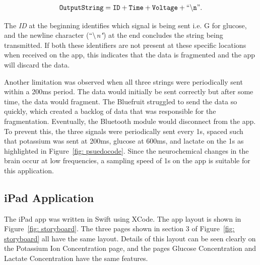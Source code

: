 \begin{align}
    \tt{OutputString = ID + Time + Voltage + ``\backslash n"}.
    \nonumber
\end{align}

The \textit{ID} at the beginning identifies which signal is being sent i.e. G for glucose, and the newline character (\textit{$``\backslash$n"}) at the end concludes the string being transmitted. If both these identifiers are not present at these specific locations when received on the app, this indicates that the data is fragmented and the app will discard the data. 

Another limitation was observed when all three strings were periodically sent within a 200ms period. The data would initially be sent correctly but after some time, the data would fragment. The Bluefruit struggled to send the data so quickly, which created a backlog of data that was responsible for the fragmentation. Eventually, the Bluetooth module would disconnect from the app. To prevent this, the three signals were periodically sent every 1s, spaced such that potassium was sent at 200ms, glucose at 600ms, and lactate on the 1s as highlighted in Figure~\ref{fig: psuedocode}. Since the neurochemical changes in the brain occur at low frequencies, a sampling speed of 1s on the app is suitable for this application. 





\subsection{iPad Application}
The iPad app was written in Swift using XCode. The app layout is shown in Figure~\ref{fig: storyboard}. The three pages shown in section 3 of Figure~\ref{fig: storyboard} all have the same layout. Details of this layout can be seen clearly on the Potassium Ion Concentration page, and the pages Glucose Concentration and Lactate Concentration have the same features. 

